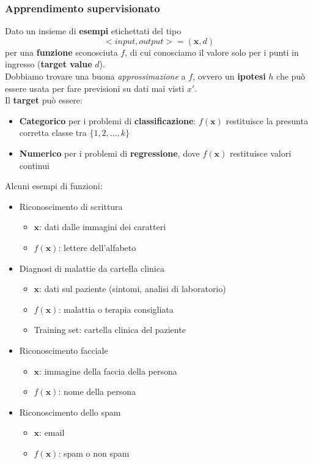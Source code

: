 \subsubsection{Apprendimento supervisionato}
\begin{definition}[Task]
	Dato un insieme di \textbf{esempi} etichettati del tipo
	\begin{equation*}
		<input,output>=(\textbf{x},d)
	\end{equation*}
	per una \textbf{funzione} sconosciuta $f$, di cui conosciamo il valore solo per i punti in ingresso (\textbf{target value} $d$).\\
	Dobbiamo trovare una buona \textit{approssimazione} a $f$, ovvero un \textbf{ipotesi} $h$ che può essere usata per fare previsioni su dati mai visti $x'$.\\
	Il \textbf{target} può essere:
	\begin{itemize}
		\item \textbf{Categorico} per i problemi di \textbf{classificazione}: $f(\textbf{x})$ restituisce la presunta corretta classe tra $\{1,2,\ldots, k\}$
		\item \textbf{Numerico} per i problemi di \textbf{regressione}, dove $f(\textbf{x})$ restituisce valori continui
	\end{itemize}
\end{definition}

\begin{example}
	Alcuni esempi di funzioni:
	\begin{itemize}
		\item Riconoscimento di scrittura
		\begin{itemize}
			\item $\textbf{x}$: dati dalle immagini dei caratteri
			\item $f(\textbf{x})$: lettere dell'alfabeto
		\end{itemize}
		\item Diagnosi di malattie da cartella clinica
		\begin{itemize}
			\item $\textbf{x}$: dati sul paziente (sintomi, analisi di laboratorio)
			\item $f(\textbf{x})$: malattia o terapia consigliata
			\item Training set: cartella clinica del paziente
		\end{itemize}
		\item Riconoscimento facciale
		\begin{itemize}
			\item $\textbf{x}$: immagine della faccia della persona
			\item $f(\textbf{x})$: nome della persona
		\end{itemize}
		\item Riconoscimento dello spam
		\begin{itemize}
			\item $\textbf{x}$: email
			\item $f(\textbf{x})$: spam o non spam
		\end{itemize}
	\end{itemize}
\end{example}

